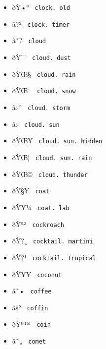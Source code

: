 \begin{itemize}
\item
  \label{symbol-clock.old}{{ ðŸ•° }
  \texttt{\ clock.\ old\ }}
\item
  \label{symbol-clock.timer}{{ â?² }
  \texttt{\ clock.\ timer\ }}
\item
  \label{symbol-cloud}{{ â˜? } \texttt{\ cloud\ }}
\item
  \label{symbol-cloud.dust}{{ ðŸ'¨ }
  \texttt{\ cloud.\ dust\ }}
\item
  \label{symbol-cloud.rain}{{ ðŸŒ§ }
  \texttt{\ cloud.\ rain\ }}
\item
  \label{symbol-cloud.snow}{{ ðŸŒ¨ }
  \texttt{\ cloud.\ snow\ }}
\item
  \label{symbol-cloud.storm}{{ â›ˆ }
  \texttt{\ cloud.\ storm\ }}
\item
  \label{symbol-cloud.sun}{{ â› }
  \texttt{\ cloud.\ sun\ }}
\item
  \label{symbol-cloud.sun.hidden}{{ ðŸŒ¥ }
  \texttt{\ cloud.\ sun.\ hidden\ }}
\item
  \label{symbol-cloud.sun.rain}{{ ðŸŒ¦ }
  \texttt{\ cloud.\ sun.\ rain\ }}
\item
  \label{symbol-cloud.thunder}{{ ðŸŒ© }
  \texttt{\ cloud.\ thunder\ }}
\item
  \label{symbol-coat}{{ ðŸ§¥ } \texttt{\ coat\ }}
\item
  \label{symbol-coat.lab}{{ ðŸ¥¼ }
  \texttt{\ coat.\ lab\ }}
\item
  \label{symbol-cockroach}{{ ðŸª³ }
  \texttt{\ cockroach\ }}
\item
  \label{symbol-cocktail.martini}{{ ðŸ?¸ }
  \texttt{\ cocktail.\ martini\ }}
\item
  \label{symbol-cocktail.tropical}{{ ðŸ?¹ }
  \texttt{\ cocktail.\ tropical\ }}
\item
  \label{symbol-coconut}{{ ðŸ¥¥ } \texttt{\ coconut\ }}
\item
  \label{symbol-coffee}{{ â˜• } \texttt{\ coffee\ }}
\item
  \label{symbol-coffin}{{ âš° } \texttt{\ coffin\ }}
\item
  \label{symbol-coin}{{ ðŸª™ } \texttt{\ coin\ }}
\item
  \label{symbol-comet}{{ â˜„ } \texttt{\ comet\ }}

\end{itemize}

